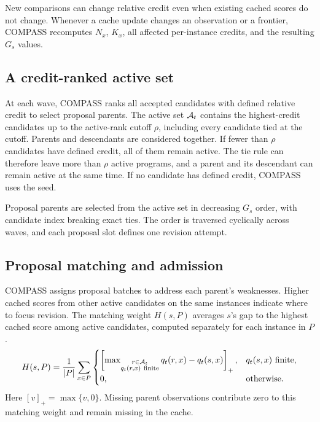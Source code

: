 New comparisons can change relative credit even when existing cached scores do
not change.  Whenever a cache update changes an observation or a frontier,
COMPASS recomputes $N_x$, $K_x$, all affected per-instance credits, and the
resulting $G_s$ values.

\subsection{A credit-ranked active set}
\label{sec:lineage_compression}

At each wave, COMPASS ranks all accepted candidates with defined relative credit
to select proposal parents.  The active set $\mathcal{A}_t$ contains the highest-credit candidates up to the
active-rank cutoff $\rho$, including every candidate tied at the cutoff.  Parents
and descendants are considered together.  If fewer than $\rho$ candidates have defined credit,
all of them remain active.  The tie rule can therefore leave more than $\rho$
active programs, and a parent and its descendant can remain active at the same
time.  If no candidate has defined credit, COMPASS uses the seed.

Proposal parents are selected from the active set in decreasing $G_s$ order,
with candidate index breaking exact ties.  The order is traversed cyclically
across waves, and each proposal slot defines one revision attempt.

\subsection{Proposal matching and admission}
\label{sec:proposal_allocation}
\label{sec:admission_allocation}
\label{sec:commit}

COMPASS assigns proposal batches to address each parent's weaknesses.  Higher
cached scores from other active candidates on the same instances indicate where
to focus revision.  The matching weight $H(s,P)$
averages $s$'s gap to the highest cached score among active candidates,
computed separately for each instance in $P$.
\begin{equation}
H(s,P)=\frac{1}{|P|}\sum_{x\in P}
\begin{cases}
\left[\max_{\substack{r\in\A_t\\q_t(r,x)\ \mathrm{finite}}}q_t(r,x)-q_t(s,x)\right]_+,
& q_t(s,x)\ \mathrm{finite},\\
0,&\text{otherwise}.
\end{cases}
\label{eq:repairable_gap}
\end{equation}
Here $[v]_+=\max\{v,0\}$.  Missing parent observations contribute zero to this
matching weight and remain missing in the cache.

